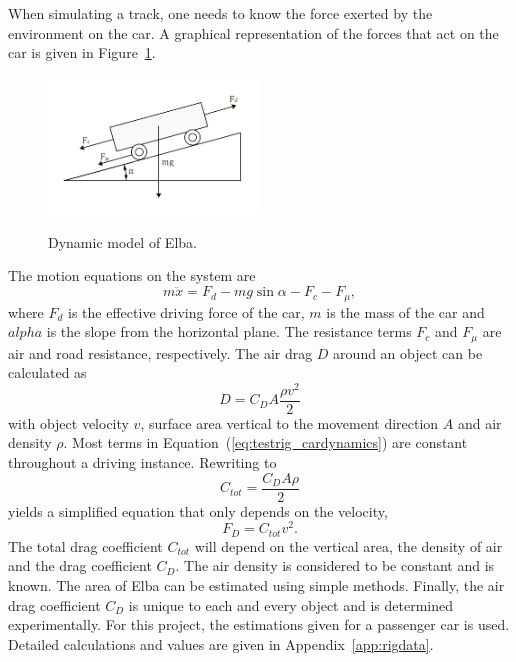 When simulating a track, one needs to know the force exerted by the environment
on the car. A graphical representation of the forces that act on the car is
given in Figure~\ref{fig:testrig_elbadynamics}.
\begin{figure}[H]
    \centering\label{fig:testrig_elbadynamics}
    \includegraphics[width=0.5\textwidth]{./img/testrig_elbaforces.png}
    \caption{Dynamic model of Elba.}
\end{figure}
The motion equations on the system are 
\begin{equation} \label{eq:testrig_cardynamics}
    m\ddot{x} = F_d - mg\sin{\alpha} - F_c - F_{\mu},
\end{equation}
where $F_d$ is the effective driving force of the car, $m$ is the mass of the
car and $alpha$ is the slope from the horizontal plane. The resistance terms
$F_c$ and $F_{\mu}$ are air and road resistance, respectively. The air drag $D$
around an object can be calculated as~\cite{nakayama2002}
\begin{equation} \label{eq:testrig_airdrag}
    D = C_D A \frac{\rho v^2} {2}
\end{equation}
with object velocity $v$, surface area vertical to the movement direction $A$
and air density $\rho$. Most terms in Equation~(\ref{eq:testrig_cardynamics})
are constant throughout a driving instance. Rewriting to
\begin{equation} \label{eq:testrig_csimple}
    C_{tot} = \frac{C_D A \rho} {2}
\end{equation}
yields a simplified equation that only depends on the velocity,
\begin{equation} \label{eq:drag}
    F_D = C_{tot}v^2.
\end{equation}
The total drag coefficient $C_{tot}$ will depend on the vertical area, the density of
air and the drag coefficient $C_D$. The air density is considered to be constant
and is known. The area of Elba can be estimated using simple methods. Finally,
the air drag coefficient $C_D$ is unique to each and every object and is
determined experimentally. For this project, the estimations given for a
passenger car is used. Detailed calculations and values are given in
Appendix~\ref{app:rigdata}. 

